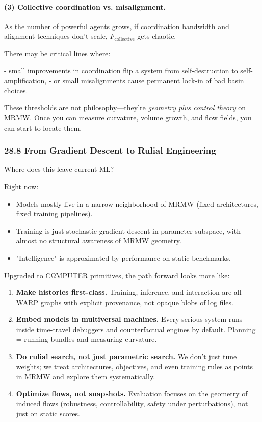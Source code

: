 \paragraph{(3) Collective coordination vs. misalignment.}

As the number of powerful agents grows, if coordination bandwidth and alignment
techniques don’t scale, $F_\text{collective}$ gets chaotic.

There may be critical lines where:

- small improvements in coordination flip a system from self-destruction to self-amplification,
- or small misalignments cause permanent lock-in of bad basin choices.

These thresholds are not philosophy—they’re \emph{geometry plus control theory}
on MRMW. Once you can measure curvature, volume growth, and flow fields, you
can start to locate them.

\subsubsection*{28.8  From Gradient Descent to Rulial Engineering}

Where does this leave current ML?

Right now:

\begin{itemize}
  \item Models mostly live in a narrow neighborhood of MRMW (fixed architectures, fixed training pipelines).
  \item Training is just stochastic gradient descent in parameter subspace, with almost no structural awareness of MRMW geometry.
  \item "Intelligence" is approximated by performance on static benchmarks.
\end{itemize}

Upgraded to CΩMPUTER primitives, the path forward looks more like:

\begin{enumerate}
  \item \textbf{Make histories first-class.} Training, inference, and interaction are all WARP graphs with explicit provenance, not opaque blobs of log files.

  \item \textbf{Embed models in multiversal machines.} Every serious system runs inside time-travel debuggers and counterfactual engines by default. Planning = running bundles and measuring curvature.

  \item \textbf{Do rulial search, not just parametric search.} We don’t just tune weights; we treat architectures, objectives, and even training rules as points in MRMW and explore them systematically.

  \item \textbf{Optimize flows, not snapshots.} Evaluation focuses on the geometry of induced flows (robustness, controllability, safety under perturbations), not just on static scores.
\end{enumerate}

